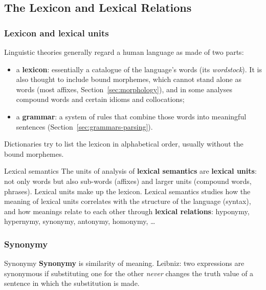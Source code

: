 \subsection{The Lexicon and Lexical Relations}
\label{sec:lexical-relations}

\subsubsection{Lexicon and lexical units}

Linguistic theories generally regard a human language as made of two parts:
\begin{itemize}[nosep]
  \item a \textbf{lexicon}: essentially a catalogue of the language's words (its
        \emph{wordstock}). It is also thought to include bound morphemes, which cannot
        stand alone as words (most affixes, Section~\ref{sec:morphology}), and in some
        analyses compound words and certain idioms and collocations;
  \item a \textbf{grammar}: a system of rules that combine those words into meaningful
        sentences (Section~\ref{sec:grammars-parsing}).
\end{itemize}
Dictionaries try to list the lexicon in alphabetical order, usually without the bound
morphemes.

\begin{nbdef}{Lexical semantics}
The units of analysis of \textbf{lexical semantics} are \textbf{lexical units}: not only
words but also sub-words (affixes) and larger units (compound words, phrases). Lexical
units make up the lexicon. Lexical semantics studies how the meaning of lexical units
correlates with the structure of the language (syntax), and how meanings relate to each
other through \textbf{lexical relations}: hyponymy, hypernymy, synonymy, antonymy,
homonymy, \ldots
\end{nbdef}

\subsubsection{Synonymy}

\begin{nbdef}{Synonymy}
\textbf{Synonymy} is similarity of meaning. Leibniz: two expressions are synonymous if
substituting one for the other \emph{never} changes the truth value of a sentence in which
the substitution is made.
\end{nbdef}

